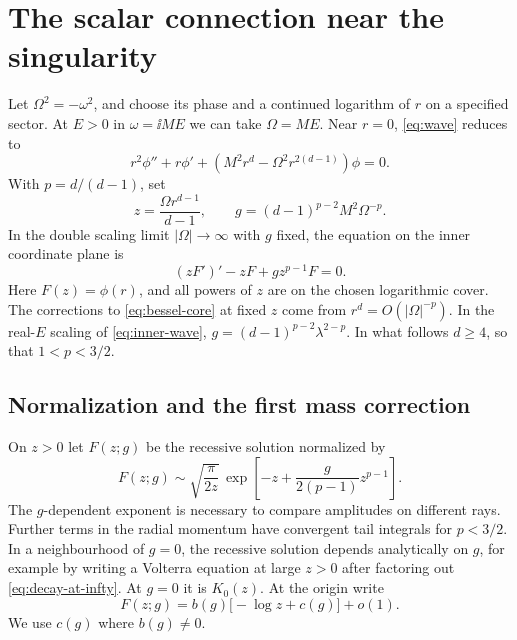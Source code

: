 \section{The scalar connection near the singularity}
\label{sec:connection}

Let \(\Omega^2=-\omega^2\), and choose its phase and a continued logarithm of \(r\) on a specified sector. At \(E>0\) in \(\omega=\ii M E\) we can take \(\Omega=ME\). Near \(r=0\), \eqref{eq:wave} reduces to
\begin{equation}
 r^2\phi''+r\phi'+(M^2 r^d-\Omega^2 r^{2(d-1)})\phi=0.
\end{equation}
With \(p=d/(d-1)\), set
\begin{equation}
 z=\frac{\Omega r^{d-1}}{d-1},\qquad
 g=(d-1)^{p-2}M^2\Omega^{-p}.
\end{equation}
In the double scaling limit \(|\Omega|\to\infty\) with \(g\) fixed, the equation on the inner coordinate plane is
\begin{equation}
 (zF')'-zF+g z^{p-1}F=0.
 \label{eq:bessel-core}
\end{equation}
Here \(F(z)=\phi(r)\), and all powers of \(z\) are on the chosen logarithmic cover. The corrections to \eqref{eq:bessel-core} at fixed \(z\) come from \(r^d=O(|\Omega|^{-p})\). In the real-\(E\) scaling of \eqref{eq:inner-wave}, \(g=(d-1)^{p-2}\lambda^{2-p}\). In what follows \(d\geq4\), so that \(1<p<3/2\).

\subsection{Normalization and the first mass correction}

On \(z>0\) let \(F(z;g)\) be the recessive solution normalized by
\begin{equation}
 F(z;g)\sim \sqrt{\frac{\pi}{2z}}\,
 \exp\!\left[-z+\frac{g}{2(p-1)}z^{p-1}\right].
 \label{eq:decay-at-infty}
\end{equation}
The \(g\)-dependent exponent is necessary to compare amplitudes on different rays. Further terms in the radial momentum have convergent tail integrals for \(p<3/2\). In a neighbourhood of \(g=0\), the recessive solution depends analytically on \(g\), for example by writing a Volterra equation at large \(z>0\) after factoring out \eqref{eq:decay-at-infty}. At \(g=0\) it is \(K_0(z)\). At the origin write
\begin{equation}
 F(z;g)=b(g)\big[-\log z+c(g)\big]+o(1).
\end{equation}
We use \(c(g)\) where \(b(g)\ne0\).

